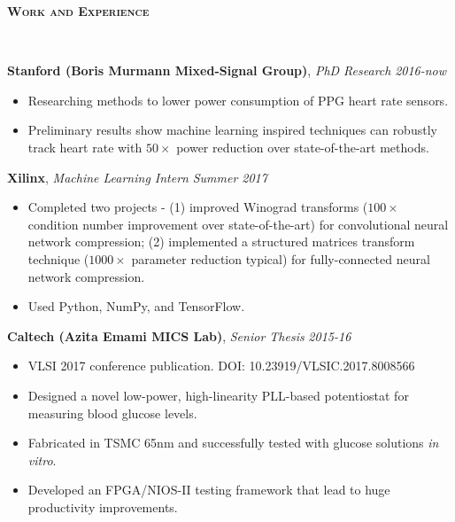 \documentclass{article}
\newenvironment{changemargin}[2]{%
  \begin{list}{}{%
    \setlength{\topsep}{0pt}%
    \setlength{\leftmargin}{#1}%
    \setlength{\rightmargin}{#2}%
    \setlength{\listparindent}{\parindent}%
    \setlength{\itemindent}{\parindent}%
    \setlength{\parsep}{\parskip}%
  }%
  \item[]}{\end{list}
}
\newcommand{\lineover}{
	\begin{changemargin}{-0.05in}{-0.05in}
		\vspace*{-8pt}
		\hrulefill \\
		\vspace*{-2pt}
	\end{changemargin}
}
\newcommand{\header}[1]{
	\begin{changemargin}{-.5in}{-0.5in}
		{\large \textbf{\scshape{#1}}}\\
  	\lineover
	\end{changemargin}
}
\newenvironment{body} {
	\vspace*{-16pt}
	\begin{changemargin}{-0.25in}{-0.5in}
  }	
	{\end{changemargin}
}
\begin{document}
\smallskip


\header{Work and Experience}

\begin{body}
	\vspace{14pt}
	
	\textbf{Stanford (Boris Murmann Mixed-Signal Group)}, \emph{PhD Research} \hfill \emph{2016-now}\\
	\vspace*{-4pt}
	\begin{itemize}
	    \item Researching methods to lower power consumption of PPG heart rate sensors.
	    \item Preliminary results show machine learning inspired techniques can robustly track heart rate with $50\times$ power reduction over state-of-the-art methods.
	\end{itemize}
	
	\smallskip
	
	\textbf{Xilinx}, \emph{Machine Learning Intern} \hfill \emph{Summer 2017}\\
	\vspace*{-4pt}
	\begin{itemize}
		\item Completed two projects - (1) improved Winograd transforms ($100\times$ condition number improvement over state-of-the-art) for convolutional neural network compression; (2) implemented a structured matrices transform technique ($1000\times$ parameter reduction typical) for fully-connected neural network compression.
		\item Used Python, NumPy, and TensorFlow.
	\end{itemize}

	\smallskip

	\textbf{Caltech (Azita Emami MICS Lab)}, \emph{Senior Thesis} \hfill \emph{2015-16}\\
	\vspace*{-4pt}
	\begin{itemize}
		\item VLSI 2017 conference publication. DOI: 10.23919/VLSIC.2017.8008566
		\item Designed a novel low-power, high-linearity PLL-based potentiostat for measuring blood glucose levels.
		\item Fabricated in TSMC 65nm and successfully tested with glucose solutions \emph{in vitro}.
		\item Developed an FPGA/NIOS-II testing framework that lead to huge productivity improvements.
	\end{itemize}


\end{body}
\end{document}
